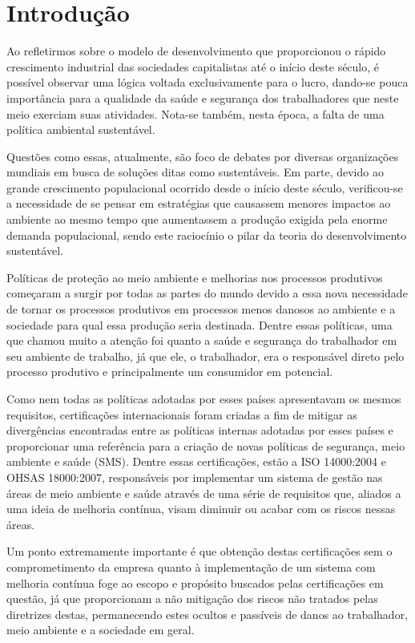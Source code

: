 \chapter{Introdução}

Ao refletirmos sobre o modelo de desenvolvimento que proporcionou o rápido crescimento industrial das sociedades capitalistas até o início deste século, é possível observar uma lógica voltada exclusivamente para o lucro, dando-se pouca importância para a qualidade da saúde e segurança dos trabalhadores que neste meio exerciam suas atividades. Nota-se também, nesta época, a falta de uma política ambiental sustentável.

Questões como essas, atualmente, são foco de debates por diversas organizações mundiais em busca de soluções ditas como sustentáveis. Em parte, devido ao grande crescimento populacional ocorrido desde o início deste século, verificou-se a necessidade de se pensar em estratégias que causassem menores impactos ao ambiente ao mesmo tempo que aumentassem a produção exigida pela enorme demanda populacional, sendo este raciocínio o pilar da teoria do desenvolvimento sustentável.

Políticas de proteção ao meio ambiente e melhorias nos processos produtivos começaram a surgir por todas as partes do mundo devido a essa nova necessidade de tornar os processos produtivos em processos menos danosos ao ambiente e a sociedade para qual essa produção seria destinada. Dentre essas políticas, uma que chamou muito a atenção foi quanto a saúde e segurança do trabalhador em seu ambiente de trabalho, já que ele, o trabalhador, era o responsável direto pelo processo produtivo e principalmente um consumidor em potencial.

Como nem todas as políticas adotadas por esses países apresentavam os mesmos requisitos, certificações internacionais foram criadas a fim de mitigar as divergências encontradas entre as políticas internas adotadas por esses países e proporcionar uma referência para a criação de novas políticas de segurança, meio ambiente e saúde (SMS). Dentre essas certificações, estão a ISO 14000:2004 e OHSAS 18000:2007, responsáveis por implementar um sistema de gestão nas áreas de meio ambiente e saúde através de uma série de requisitos que, aliados a uma ideia de melhoria contínua, visam diminuir ou acabar com os riscos nessas áreas.

Um ponto extremamente importante é que obtenção destas certificações sem o comprometimento da empresa quanto à implementação de um sistema com melhoria contínua foge ao escopo e propósito buscados pelas certificações em questão, já que proporcionam a não mitigação dos riscos não tratados pelas diretrizes destas, permanecendo estes ocultos e passíveis de danos ao trabalhador, meio ambiente e a sociedade em geral.

